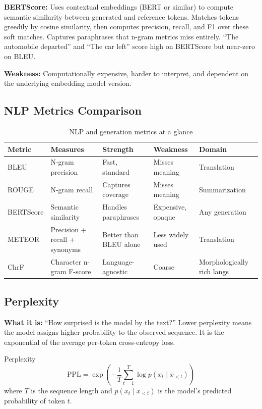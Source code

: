 \textbf{BERTScore:} Uses contextual embeddings (BERT or similar) to compute semantic similarity between generated and reference tokens. Matches tokens greedily by cosine similarity, then computes precision, recall, and F1 over these soft matches. Captures paraphrases that n-gram metrics miss entirely. ``The automobile departed'' and ``The car left'' score high on BERTScore but near-zero on BLEU.

\textbf{Weakness:} Computationally expensive, harder to interpret, and dependent on the underlying embedding model version.

\subsection{NLP Metrics Comparison}

\begin{table}[H]
\centering
\caption{NLP and generation metrics at a glance}
\begin{tabularx}{\textwidth}{lXXXl}
\toprule
\textbf{Metric} & \textbf{Measures} & \textbf{Strength} & \textbf{Weakness} & \textbf{Domain} \\
\midrule
BLEU & N-gram precision & Fast, standard & Misses meaning & Translation \\
ROUGE & N-gram recall & Captures coverage & Misses meaning & Summarization \\
BERTScore & Semantic similarity & Handles paraphrases & Expensive, opaque & Any generation \\
METEOR & Precision + recall + synonyms & Better than BLEU alone & Less widely used & Translation \\
ChrF & Character n-gram F-score & Language-agnostic & Coarse & Morphologically rich langs \\
\bottomrule
\end{tabularx}
\end{table}

\subsection{Perplexity}

\textbf{What it is:} ``How surprised is the model by the text?'' Lower perplexity means the model assigns higher probability to the observed sequence. It is the exponential of the average per-token cross-entropy loss.

\begin{mathresult}{Perplexity}
\[
\text{PPL} = \exp\left(-\frac{1}{T}\sum_{t=1}^{T}\log p(x_t \mid x_{<t})\right)
\]
where $T$ is the sequence length and $p(x_t \mid x_{<t})$ is the model's predicted probability of token $t$.
\end{mathresult}

